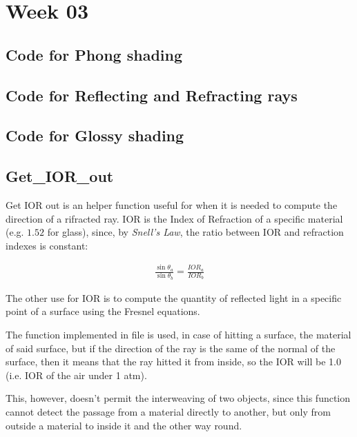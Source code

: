 \chapter{Week 03}

  

  \section{Code for Phong shading}
    

  \section{Code for Reflecting and Refracting rays}
    
  
  \section{Code for Glossy shading}
    

  \section{Get\_IOR\_out}

    Get IOR out is an helper function useful for when it is needed to compute the direction of a rifracted ray. IOR is
    the Index of Refraction of a specific material (e.g. $1.52$ for glass), since, by \emph{Snell's Law}, the ratio
    between IOR and refraction indexes is constant:

    \begin{align}
      \frac{\sin{}\theta{}_{a}}{\sin{}\theta{}_{b}} = \frac{IOR_{a}}{IOR_{b}}
    \end{align}

    The other use for IOR is to compute the quantity of reflected light in a specific point of a surface using the
    Fresnel equations.

    The function implemented in file  is used, in case of hitting a surface, the material of said
    surface, but if the direction of the ray is the same of the normal of the surface, then it means that the ray hitted
    it from inside, so the IOR will be 1.0 (i.e. IOR of the air under 1 atm).

    This, however, doesn't permit the interweaving of two objects, since this function cannot detect the passage from a
    material directly to another, but only from outside a material to inside it and the other way round.
